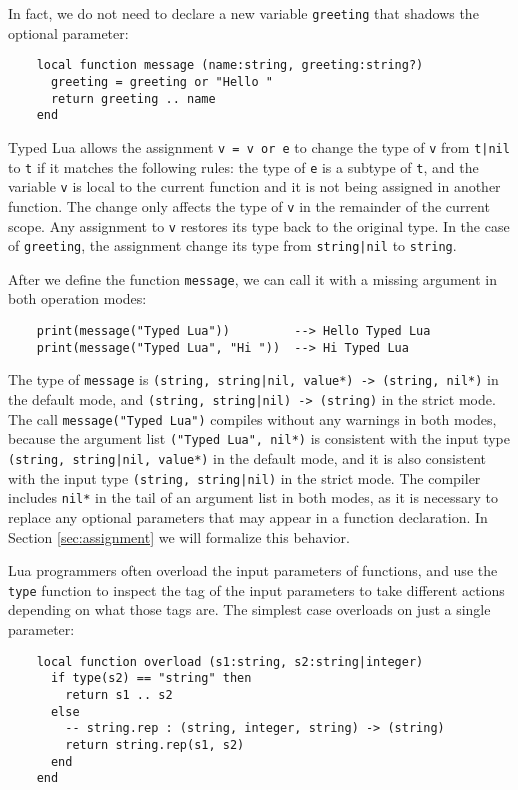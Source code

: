 In fact, we do not need to declare a new variable \texttt{greeting} that
shadows the optional parameter:
\begin{verbatim}
    local function message (name:string, greeting:string?)
      greeting = greeting or "Hello "
      return greeting .. name
    end
\end{verbatim}

Typed Lua allows the assignment \texttt{v = v or e} to change
the type of \texttt{v} from \texttt{t|nil} to \texttt{t}
if it matches the following rules: 
the type of \texttt{e} is a subtype of \texttt{t},
and the variable \texttt{v} is local to the current function
and it is not being assigned in another function.
The change only affects the type of \texttt{v} in the remainder
of the current scope.
Any assignment to \texttt{v} restores its type back to the
original type.
In the case of \texttt{greeting}, the assignment change its type
from \texttt{string|nil} to \texttt{string}. 

After we define the function \texttt{message}, we can call it
with a missing argument in both operation modes:
\begin{verbatim}
    print(message("Typed Lua"))         --> Hello Typed Lua
    print(message("Typed Lua", "Hi "))  --> Hi Typed Lua
\end{verbatim}

The type of \texttt{message} is
\texttt{(string, string|nil, value*) -> (string, nil*)}
in the default mode, and
\texttt{(string, string|nil) -> (string)}
in the strict mode.
The call \texttt{message("Typed Lua")} compiles without
any warnings in both modes, because the argument list
\texttt{("Typed Lua", nil*)} is consistent with the input type
\texttt{(string, string|nil, value*)} in the default mode,
and it is also consistent with the input type
\texttt{(string, string|nil)} in the strict mode.
The compiler includes \texttt{nil*} in the tail of
an argument list in both modes, as it is necessary
to replace any optional parameters that may appear in
a function declaration.
In Section \ref{sec:assignment} we will formalize this behavior.

Lua programmers often overload the input parameters of functions,
and use the \texttt{type} function to inspect the tag of the
input parameters to take different actions depending on what
those tags are.
The simplest case overloads on just a single parameter:
\begin{verbatim}
    local function overload (s1:string, s2:string|integer)
      if type(s2) == "string" then
        return s1 .. s2
      else
        -- string.rep : (string, integer, string) -> (string)
        return string.rep(s1, s2)
      end
    end
\end{verbatim}

